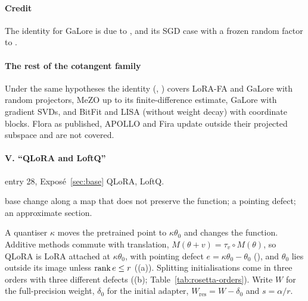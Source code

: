 \paragraph{Credit}
The identity for GaLore \citep{zhao2024galore} is due to \citet{xtorrobahennigen2025duality}, and its SGD case with a
frozen random factor to \citet{hao2024flora}.

\paragraph{The rest of the cotangent family}
Under the same hypotheses the identity (, ) covers LoRA-FA and
GaLore with random projectors, MeZO up to its finite-difference estimate, GaLore with gradient SVDs, and BitFit and LISA
(without weight decay) with coordinate blocks. Flora as published, APOLLO and Fira update outside their projected
subspace and are not covered.

\paragraph{V. ``QLoRA and LoftQ''}

\begin{example*}{entry 28, Exposé~\ref{sec:base}}
\enspace QLoRA, LoftQ.\par
\noindent{}\enspace base change along a map that does not
preserve the function; a pointing defect; an approximate section.
\end{example*}

A quantiser $\kappa$ moves the pretrained point to $\kappa\theta_0$ and changes the function. Additive methods commute
with translation, $M(\theta+v)=\tau_v\circ M(\theta)$, so QLoRA \citep{dettmers2023qlora} is LoRA attached at
$\kappa\theta_0$, with pointing defect $e=\kappa\theta_0-\theta_0$ (), and $\theta_0$ lies
outside its image unless $\operatorname{rank} e\le r$ ((a)). Splitting initialisations come in three orders
with three different defects ((b); Table~\ref{tab:rosetta-orders}). Write $W$ for the
full-precision weight, $\delta_0$ for the initial adapter, $W_{\mathrm{res}}=W-\delta_0$ and $s=\alpha/r$.

